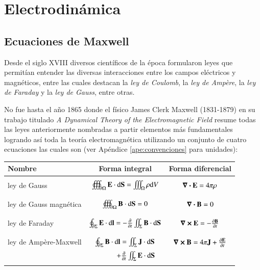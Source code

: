 \chapter{Electrodinámica}
\label{cap:1}
\newpage

\section{Ecuaciones de Maxwell}

Desde el siglo XVIII diversos científicos de la época formularon leyes que permitían entender las diversas interacciones entre los campos eléctricos y magnéticos, entre las cuales destacan la \textit{ley de Coulomb}, la \textit{ley de Ampère}, la \textit{ley de Faraday} y la \textit{ley de Gauss}, entre otras. 

No fue hasta el año 1865 donde el físico James Clerk Maxwell (1831-1879) en su trabajo titulado \textit{A Dynamical Theory of the Electromagnetic Field} \cite{Maxwell} resume todas las leyes anteriormente nombradas a partir elementos más fundamentales logrando así toda la teoría electromagnética utilizando un conjunto de cuatro ecuaciones las cuales son (ver Apéndice \ref{ape:convenciones} para unidades):
\begin{center}
\begin{tabular}{l|c|c}
Nombre & Forma integral & Forma diferencial \\
\hline \hline
 & & \\
ley de Gauss & $\oiiint_{\partial \Omega} \vb{E} \cdot \mathrm{d}\vb{S} = \iiint_{\Omega} \rho \mathrm{d}V $ & $\div{\vb{E}} = 4\pi \rho$ \\
 & & \\
\hline
 & & \\
ley de Gauss magnética & $\oiiint_{\partial \Omega} \vb{B} \cdot \mathrm{d}\vb{S} = 0 $ & $\div{\vb{B}} = 0$ \\
 & & \\
\hline
 & & \\
ley de Faraday & $\oint_{\partial \Sigma} \vb{E} \cdot \mathrm{d} \vb{l} = - \pdv{}{t} \iint_{\Sigma} \vb{B} \cdot \mathrm{d} \vb{S}$ & $\curl{\vb{E}} = - \pdv{\vb{B}}{t}$ \\
 & & \\
\hline
 & & \\
ley de Ampère-Maxwell & $\oint_{\partial \Sigma} \vb{B} \cdot \mathrm{d}\vb{l} = \iint_{\Sigma} \vb{J} \cdot \mathrm{d} \vb{S} $ & $\curl{\vb{B}} = 4 \pi \vb{J} +  \pdv{\vb{E}}{t}$\\
 & $\qquad \quad + \pdv{}{t} \iint_{\Sigma} \vb{E} \cdot \mathrm{d} \vb{S}$ & \\
  & & 
\end{tabular} 
\end{center}

